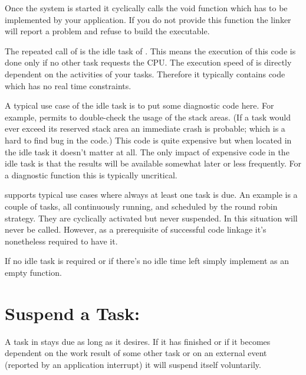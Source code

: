 Once the system is started it cyclically calls the void function
 which has to be implemented by your application. If you do
not provide this function the linker will report a problem and refuse to
build the executable.

The repeated call of  is the idle task of \rtos{}. This means
the execution of this code is done only if no other task requests the
CPU. The execution speed of  is directly dependent on the
activities of your tasks. Therefore it typically contains code which has
no real time constraints.

A typical use case of the idle task is to put some diagnostic code here.
For example, \rtos{} permits to double-check the usage of the stack areas.
(If a task would ever exceed its reserved stack area an immediate crash is
probable; which is a hard to find bug in the code.) This code is quite
expensive but when located in the idle task it doesn't matter at all. The
only impact of expensive code in the idle task is that the results will be
available somewhat later or less frequently. For a diagnostic function
this is typically uncritical.

\rtos{} supports typical use cases where always at least one task is due.
An example is a couple of tasks, all continuously running, and scheduled
by the round robin strategy. They are cyclically activated but never
suspended. In this situation  will never be called. However,
as a prerequisite of successful code linkage it's nonetheless required to
have it.

If no idle task is required or if there's no idle time left simply
implement  as an empty function.


\section{Suspend a Task: }
\label{secAPIWaitForEvent}

A task in \rtos{} stays due as long as it desires. If it has finished or
if it becomes dependent on the work result of some other task or on an
external event (reported by an application interrupt) it will suspend
itself voluntarily.

